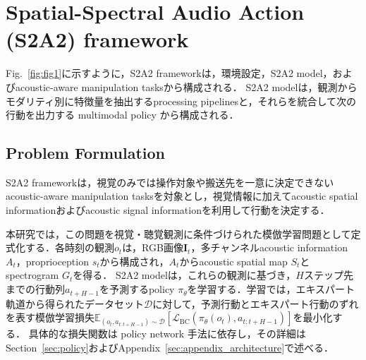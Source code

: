\documentclass{article}
\begin{document}
\section{Spatial-Spectral Audio Action (S2A2) framework}
\label{sec:s2a2_framework}

	Fig.~\ref{fig:fig1}に示すように，S2A2 frameworkは，環境設定，S2A2 model，およびacoustic-aware manipulation tasksから構成される．
	S2A2 modelは，観測からモダリティ別に特徴量を抽出するprocessing pipelinesと，それらを統合して次の行動を出力する multimodal policy から構成される．
	

\subsection{Problem Formulation}
\label{sec:problem}
S2A2 frameworkは，視覚のみでは操作対象や搬送先を一意に決定できないacoustic-aware manipulation tasksを対象とし，視覚情報に加えてacoustic spatial informationおよびacoustic signal informationを利用して行動を決定する．

本研究では，この問題を視覚・聴覚観測に条件づけられた模倣学習問題として定式化する．各時刻の観測$o_t$は，RGB画像$\mathbf{I}_t$，多チャンネルacoustic information $A_t$，proprioception $s_t$から構成され，$A_t$からacoustic spatial map $S_t$とspectrogram $G_t$を得る．
S2A2 modelは，これらの観測に基づき，$H$ステップ先までの行動列$a_{t+H-1}$を予測するpolicy $\pi_\theta$を学習する．学習では，エキスパート軌道から得られたデータセット$\mathcal{D}$に対して，予測行動とエキスパート行動のずれを表す模倣学習損失$\mathbb{E}_{(o_t,a_{t:t+H-1})\sim\mathcal{D}}
	\left[\mathcal{L}_{\mathrm{BC}}\left(\pi_\theta(o_t),a_{t:t+H-1}\right)\right]$を最小化する．
具体的な損失関数は policy network 手法に依存し，その詳細はSection~\ref{sec:policy}およびAppendix~\ref{sec:appendix_architecture}で述べる．


\end{document}
